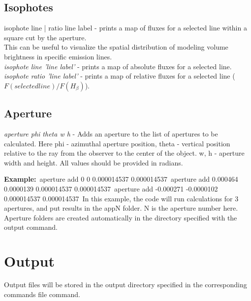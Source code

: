 \documentclass[a4paper]{article}
\begin{document}
\subsection{Isophotes}
isophote {line | ratio} {line label} - prints a map of fluxes for a selected line within a square cut by the aperture. \\
This can be useful to visualize the spatial distribution of modeling volume brightness in specific emission lines. \\
    {\it isophote line 'line label'} - prints a map of absolute fluxes for a selected line. \\
    {\it isophote ratio 'line label'} - prints a map of relative fluxes for a selected line ($F(selected line)/F(H_{\beta})$). \\

\subsection{Aperture}

{\it aperture phi theta w h} - Adds an aperture to the list of apertures to be calculated.
Here phi - azimuthal aperture position, theta - vertical position relative to the ray
from the observer to the center of the object. w, h - aperture width and height. All values
should be provided in radians.\

    {\bf Example:}\
aperture add 0 0 0.000014537 0.000014537\
aperture add 0.000464 0.0000139 0.000014537 0.000014537\
aperture add -0.000271 -0.0000102 0.000014537 0.000014537\
In this example, the code will run calculations for 3 apertures, and put results in the
app{N} folder.
N is the aperture number here. Aperture folders are created automatically
in the directory specified with the output command.

\section{Output}
Output files will be stored in the output directory specified in the corresponding commands file command.
\end{document}
